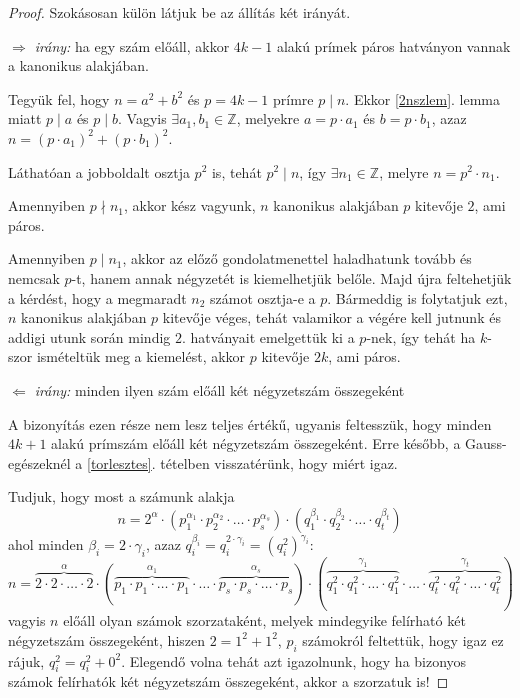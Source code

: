 \documentclass[12pt]{book}
\theoremstyle{plain} %
\theoremstyle{definition} %
\theoremstyle{remark}
\numberwithin{equation}{section}  %
\def\Z{\mathbb{Z}}
\begin{document}
	\begin{proof} Szokásosan külön látjuk be az állítás két irányát.
		
		\textit{$\Rightarrow$ irány:} ha egy szám előáll, akkor $4k-1$ alakú prímek páros hatványon vannak a kanonikus alakjában.
		
		Tegyük fel, hogy $n=a^2+b^2$ és $p=4k-1$ prímre $p\mid n$. Ekkor \ref{2nszlem}. lemma miatt $p\mid a$ és $p\mid b$. Vagyis $\exists a_1,b_1\in \Z$, melyekre $a=p\cdot a_1$ és $b=p\cdot b_1$, azaz $n=(p\cdot a_1)^2 + (p\cdot b_1)^2$. 
		
		Láthatóan a jobboldalt osztja $p^2$ is, tehát $p^2\mid n$, így $\exists n_1\in \Z$, melyre $n=p^2\cdot n_1$.
		
		Amennyiben $p \nmid n_1$, akkor kész vagyunk, $n$ kanonikus alakjában $p$ kitevője $2$, ami páros.
		
		Amennyiben $p \mid n_1$, akkor az előző gondolatmenettel haladhatunk tovább és nemcsak $p$-t, hanem annak négyzetét is kiemelhetjük belőle. Majd újra feltehetjük a kérdést, hogy a megmaradt $n_2$ számot osztja-e a $p$. Bármeddig is folytatjuk ezt, $n$ kanonikus alakjában $p$ kitevője véges, tehát valamikor a végére kell jutnunk és addigi utunk során mindig $2$. hatványait emelgettük ki a $p$-nek, így tehát ha $k$-szor ismételtük meg a kiemelést, akkor $p$ kitevője $2k$, ami páros.
		
		
		\textit{$\Leftarrow$ irány:} minden ilyen szám előáll két négyzetszám összegeként
		
		A bizonyítás ezen része nem lesz teljes értékű, ugyanis feltesszük, hogy minden $4k+1$ alakú prímszám előáll két négyzetszám összegeként. Erre később, a Gauss-egészeknél a \ref{torlesztes}. tételben visszatérünk, hogy miért igaz.
		
		Tudjuk, hogy most a számunk alakja
		\[ n = 2^{\alpha} \cdot (p_1^{\alpha_1} \cdot p_2^{\alpha_2} \cdot \ldots \cdot p_s^{\alpha_s} ) \cdot (q_1^{\beta_1} \cdot q_2^{\beta_2} \cdot \ldots \cdot q_t^{\beta_t})   \]
		ahol minden $ \beta_i = 2\cdot \gamma_i $, azaz $q_i^{\beta_i} = q_i^{2\cdot \gamma_i} = (q_i^2)^{\gamma_i}$:
		\[ n = \overbrace{2\cdot 2\cdot \ldots \cdot 2}^{\alpha} \cdot (\overbrace{p_1\cdot p_1\cdot \ldots \cdot p_1}^{\alpha_1} \cdot \ldots \cdot \overbrace{p_s\cdot p_s\cdot \ldots \cdot p_s}^{\alpha_s} ) \cdot (\overbrace{q_1^2\cdot q_1^2\cdot \ldots \cdot q_1^2}^{\gamma_1} \cdot \ldots \cdot \overbrace{q_t^2\cdot q_t^2\cdot \ldots \cdot q_t^2}^{\gamma_t})   \]
		vagyis $n$ előáll olyan számok szorzataként, melyek mindegyike felírható két négyzetszám összegeként, hiszen $2=1^2+1^2$, $p_i$ számokról feltettük, hogy igaz ez rájuk, $q_i^2 = q_i^2+0^2$. Elegendő volna tehát azt igazolnunk, hogy ha bizonyos számok felírhatók két négyzetszám összegeként, akkor a szorzatuk is!
		

\end{proof}
\end{document}
